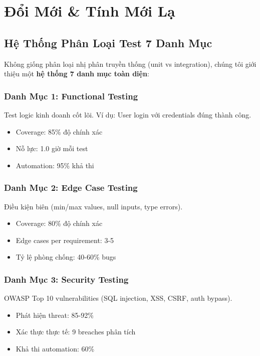 \documentclass[12pt,oneside]{report}
\begin{document}
\chapter{Đổi Mới \& Tính Mới Lạ}

\section{Hệ Thống Phân Loại Test 7 Danh Mục}

Không giống phân loại nhị phân truyền thống (unit vs integration), 
chúng tôi giới thiệu một \textbf{hệ thống 7 danh mục toàn diện}:

\subsection{Danh Mục 1: Functional Testing}
Test logic kinh doanh cốt lõi. Ví dụ: User login với credentials đúng thành công.
\begin{itemize}
    \item Coverage: 85\% độ chính xác
    \item Nỗ lực: 1.0 giờ mỗi test
    \item Automation: 95\% khả thi
\end{itemize}

\subsection{Danh Mục 2: Edge Case Testing}
Điều kiện biên (min/max values, null inputs, type errors).
\begin{itemize}
    \item Coverage: 80\% độ chính xác
    \item Edge cases per requirement: 3-5
    \item Tỷ lệ phòng chống: 40-60\% bugs
\end{itemize}

\subsection{Danh Mục 3: Security Testing}
OWASP Top 10 vulnerabilities (SQL injection, XSS, CSRF, auth bypass).
\begin{itemize}
    \item Phát hiện threat: 85-92\%
    \item Xác thực thực tế: 9 breaches phân tích
    \item Khả thi automation: 60\%
\end{itemize}
\end{document}
